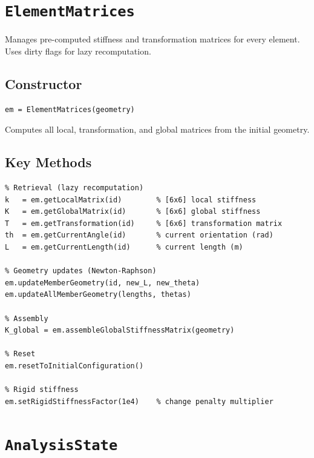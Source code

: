 \section{\texttt{ElementMatrices}}
\label{sec:api:matrices}

Manages pre-computed stiffness and transformation matrices for every element.
Uses dirty flags for lazy recomputation.

\subsection{Constructor}

\begin{lstlisting}
em = ElementMatrices(geometry)
\end{lstlisting}

Computes all local, transformation, and global matrices from the initial
geometry.

\subsection{Key Methods}

\begin{lstlisting}
% Retrieval (lazy recomputation)
k   = em.getLocalMatrix(id)        % [6x6] local stiffness
K   = em.getGlobalMatrix(id)       % [6x6] global stiffness
T   = em.getTransformation(id)     % [6x6] transformation matrix
th  = em.getCurrentAngle(id)       % current orientation (rad)
L   = em.getCurrentLength(id)      % current length (m)

% Geometry updates (Newton-Raphson)
em.updateMemberGeometry(id, new_L, new_theta)
em.updateAllMemberGeometry(lengths, thetas)

% Assembly
K_global = em.assembleGlobalStiffnessMatrix(geometry)

% Reset
em.resetToInitialConfiguration()

% Rigid stiffness
em.setRigidStiffnessFactor(1e4)    % change penalty multiplier
\end{lstlisting}

\section{\texttt{AnalysisState}}
\label{sec:api:state}

